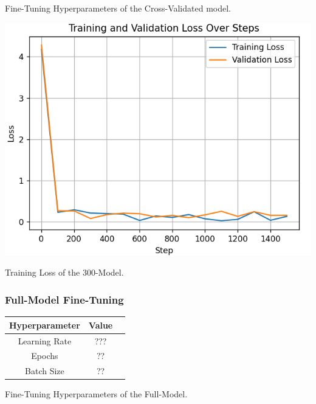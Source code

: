 \documentclass[10pt,twocolumn,letterpaper]{article}
\begin{document}
\begin{center}
    \small {Fine-Tuning Hyperparameters of the Cross-Validated model.} 
\end{center}

\begin{center}
\includegraphics*[scale=0.55]{img/training_loss_full.png} 
\end{center}

\begin{center}
    \small {Training Loss of the 300-Model.} 
\end{center}

\subsubsection*{Full-Model Fine-Tuning}

\begin{center}

    \begin{tabular}{ccc}
        \toprule
        Hyperparameter & Value \\
        \midrule
        Learning Rate & ??? \\
        Epochs & ?? \\
        Batch Size & ?? \\
        \bottomrule
    \end{tabular} 
\end{center} 

\begin{center}
    \small {Fine-Tuning Hyperparameters of the Full-Model.} 
\end{center}
\end{document}
